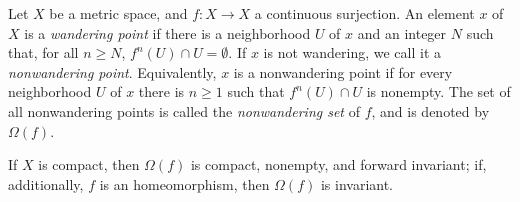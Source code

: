 \documentclass[12pt]{article}
\begin{document}
Let $X$ be a metric space, and $f:X\rightarrow X$ a continuous surjection.
An element $x$ of $X$ is a \emph{wandering point} if there is a neighborhood $U$ of $x$ and an integer $N$ such that, for all $n\geq N$, $f^n(U)\cap U=\emptyset$. If $x$ is not wandering, we call it a \emph{nonwandering point}. Equivalently, $x$ is a nonwandering point if for every neighborhood $U$
of $x$ there is $n\geq 1$ such that $f^n(U)\cap U$ is nonempty. The set of all nonwandering points is called the \emph{nonwandering set} of $f$, and is denoted by $\Omega(f)$.

If $X$ is compact, then $\Omega(f)$ is compact, nonempty, and forward invariant; if, additionally, $f$ is an homeomorphism, then $\Omega(f)$ is invariant.
\end{document}
